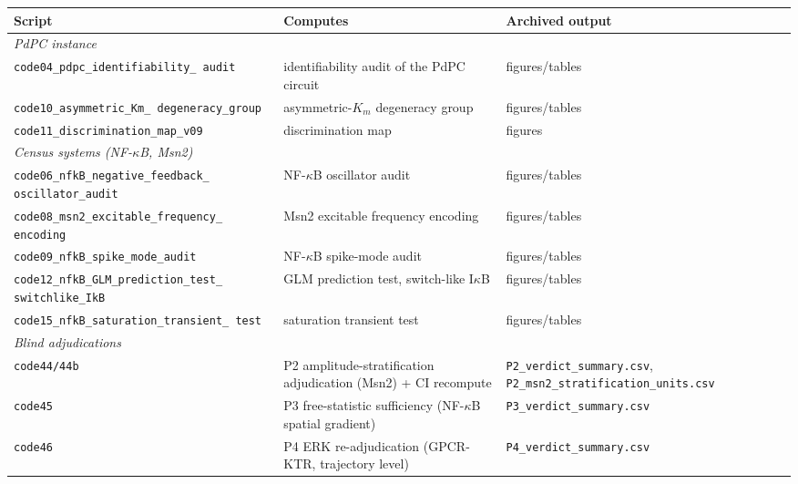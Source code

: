 \documentclass[11pt]{article}
\begin{document}
\begin{longtable}{p{5.6cm} p{6.6cm} p{3.6cm}}
\toprule
Script & Computes & Archived output \\
\midrule
\endhead
\multicolumn{3}{l}{\emph{PdPC instance}}\\
\texttt{code04\_\allowbreak{}pdpc\_\allowbreak{}identifiability\_\allowbreak{} audit} & identifiability audit of the PdPC circuit & figures/tables \\
\texttt{code10\_\allowbreak{}asymmetric\_\allowbreak{}Km\_\allowbreak{} degeneracy\_\allowbreak{}group} & asymmetric-$K_m$ degeneracy group & figures/tables \\
\texttt{code11\_\allowbreak{}discrimination\_\allowbreak{}map\_\allowbreak{}v09} & discrimination map & figures \\
\multicolumn{3}{l}{\emph{Census systems (NF-$\kappa$B, Msn2)}}\\
\texttt{code06\_\allowbreak{}nfkB\_\allowbreak{}negative\_\allowbreak{}feedback\_\allowbreak{} oscillator\_\allowbreak{}audit} & NF-$\kappa$B oscillator audit & figures/tables \\
\texttt{code08\_\allowbreak{}msn2\_\allowbreak{}excitable\_\allowbreak{}frequency\_\allowbreak{} encoding} & Msn2 excitable frequency encoding & figures/tables \\
\texttt{code09\_\allowbreak{}nfkB\_\allowbreak{}spike\_\allowbreak{}mode\_\allowbreak{}audit} & NF-$\kappa$B spike-mode audit & figures/tables \\
\texttt{code12\_\allowbreak{}nfkB\_\allowbreak{}GLM\_\allowbreak{}prediction\_\allowbreak{}test\_\allowbreak{} switchlike\_\allowbreak{}IkB} & GLM prediction test, switch-like I$\kappa$B & figures/tables \\
\texttt{code15\_\allowbreak{}nfkB\_\allowbreak{}saturation\_\allowbreak{}transient\_\allowbreak{} test} & saturation transient test & figures/tables \\
\multicolumn{3}{l}{\emph{Blind adjudications}}\\
\texttt{code44/44b} & P2 amplitude-stratification adjudication (Msn2) + CI recompute & \texttt{P2\_\allowbreak{}verdict\_\allowbreak{}summary.csv}, \texttt{P2\_\allowbreak{}msn2\_\allowbreak{}stratification\_\allowbreak{}units.csv} \\
\texttt{code45} & P3 free-statistic sufficiency (NF-$\kappa$B spatial gradient) & \texttt{P3\_\allowbreak{}verdict\_\allowbreak{}summary.csv} \\
\texttt{code46} & P4 ERK re-adjudication (GPCR-KTR, trajectory level) & \texttt{P4\_\allowbreak{}verdict\_\allowbreak{}summary.csv} \\

\end{longtable}
\end{document}
